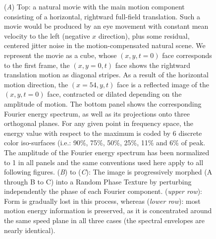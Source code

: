 \documentclass[a4paper,11pt]{article}%
\begin{document}
\newpage
\begin{figure}%
\caption{(\textit{A}) Top: a natural movie with the main motion component consisting of a horizontal, rightward full-field translation. Such a movie would be produced by an eye movement with constant mean velocity to the left (negative $x$ direction), plus some residual, centered jitter noise in the motion-compensated natural scene. We represent the movie as a cube, whose $(x,y,t=0)$ face corresponds to the first frame, the $(x,y=0,t)$ face shows the rightward translation motion as diagonal stripes. As a result of the horizontal motion direction, the $(x=54,y,t)$ face is a reflected image of the $(x,y,t=0)$ face, contracted or dilated depending on the amplitude of motion. The bottom panel shows the corresponding Fourier energy spectrum, as well as its projections onto three orthogonal planes. For any given point in frequency space, the energy value with respect to the maximum is coded by 6 discrete color iso-surfaces (i.e.: 90\%, 75\%, 50\%, 25\%, 11\% and 6\% of peak. The amplitude of the Fourier energy spectrum has been normalized to 1 in all panels and the same conventions used here apply to all following figures. (\textit{B}) to (\textit{C}): The image is progressively morphed (A through B to C) into a Random Phase Texture by perturbing independently the phase of each Fourier component.  (\textit{upper row}): Form is gradually lost in this process, whereas (\textit{lower row}): most motion energy information is preserved, as it is concentrated around the same speed plane in all three cases (the spectral envelopes are nearly identical).}%
	 \label{fig:morphing}%
\end{figure}%
\newpage %
\end{document}
